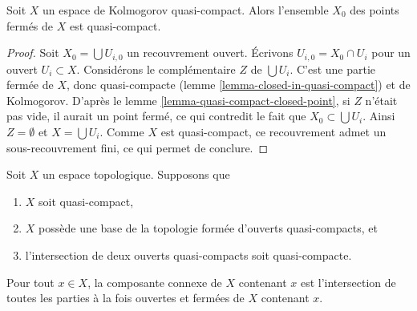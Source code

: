 \begin{lemma}
\label{lemma-closed-points-quasi-compact}
Soit $X$ un espace de Kolmogorov quasi-compact. Alors l'ensemble $X_0$ des
points fermés de $X$ est quasi-compact.
\end{lemma}

\begin{proof}
Soit $X_0 = \bigcup U_{i, 0}$ un recouvrement ouvert.
Écrivons $U_{i, 0} = X_0 \cap U_i$ pour un ouvert $U_i \subset X$.
Considérons le complémentaire $Z$ de $\bigcup U_i$. C'est une partie fermée de
$X$, donc quasi-compacte (lemme \ref{lemma-closed-in-quasi-compact})
et de Kolmogorov. D'après le lemme \ref{lemma-quasi-compact-closed-point},
si $Z$ n'était pas vide, il aurait un point
fermé, ce qui contredit le fait que $X_0 \subset \bigcup U_i$.
Ainsi $Z = \emptyset$ et $X = \bigcup U_i$. Comme $X$ est quasi-compact,
ce recouvrement admet un sous-recouvrement fini, ce qui permet de conclure.
\end{proof}

\begin{lemma}
\label{lemma-connected-component-intersection}
Soit $X$ un espace topologique.
Supposons que
\begin{enumerate}
\item $X$ soit quasi-compact,
\item $X$ possède une base de la topologie formée d'ouverts quasi-compacts, et
\item l'intersection de deux ouverts quasi-compacts soit quasi-compacte.
\end{enumerate}
Pour tout $x \in X$, la composante connexe de $X$ contenant
$x$ est l'intersection de toutes les parties à la fois ouvertes et fermées
de $X$ contenant $x$.
\end{lemma}


